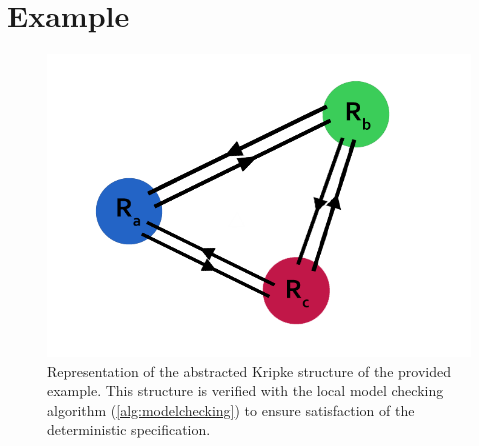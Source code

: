 

\section{Example}

\begin{figure}
    \centering
    \includegraphics{./figures/abstract_kripke.png}
    \caption[Abstracted Kripke Structure]{Representation of the abstracted Kripke structure of the provided example. This structure is verified with the local model checking algorithm (\autoref{alg:modelchecking}) to ensure satisfaction of the deterministic \mucalc{} specification.} 
\label{fig:abs_kripke}
\end{figure}

